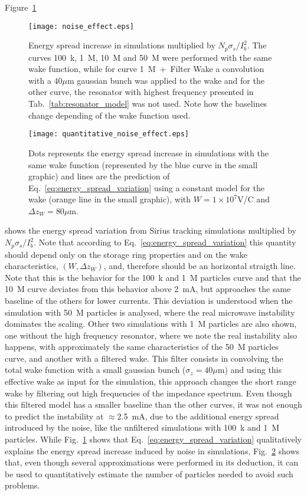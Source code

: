 \begin{apendicesenv}
    Figure~\ref{fig:noise_effect}
    \begin{figure}[t!]
        \centering
        \texttt{[image: noise\_effect.eps]}
        \caption{Energy spread increase in simulations multiplied by $N_p\sigma_s/I_b^2$. The curves 100~k, 1~M, 10~M and 50~M were performed with the same wake function, while for curve 1~M~+~Filter Wake a convolution with a $40\mu$m gaussian bunch was applied to the wake and for the other curve, the resonator with highest frequency presented in Tab.~\ref{tab:resonator_model} was not used. Note how the baselines change depending of the wake function used.}
        \label{fig:noise_effect}
    \end{figure}
    \begin{figure}[b!]
        \centering
        \texttt{[image: quantitative\_noise\_effect.eps]}
        \caption{Dots represents the energy spread increase in simulations with the same wake function (represented by the blue curve in the small graphic) and lines are the prediction of Eq.~\eqref{eq:energy_spread_variation} using a constant model for the wake (orange line in the small graphic), with $W=1\times10^7$V/C and $\Delta z_W = 80\mu$m. }
        \label{fig:quantitative_noise_effect}
    \end{figure}%
    shows the energy spread variation from Sirius tracking simulations multiplied by $N_p\sigma_s/I_b^2$. Note that according to Eq.~\eqref{eq:energy_spread_variation} this quantity should depend only on the storage ring properties and on the wake characteristics, $(W, \Delta z_W)$, and, therefore should be an horizontal straigth line. Note that this is the behavior for the 100~k and 1~M particles curve and that the 10~M curve deviates from this behavior above 2~mA, but approaches the same baseline of the others for lower currents. This deviation is understood when the simulation with 50~M particles is analysed, where the real microwave instability dominates the scaling. Other two simulations with 1~M particles are also shown, one without the high frequency resonator, where we note the real instability also happens, with approximately the same characteristics of the 50~M particles curve, and another with a filtered wake. This filter consists in convolving the total wake function with a small gaussian bunch ($\sigma_z=40\mu$m) and using this effective wake as input for the simulation, this approach changes the short range wake by filtering out high frequencies of the impedance spectrum. Even though this filtered model has a smaller baseline than the other curves, it was not enough to predict the instability at $\approx$2.5~mA, due to the additional energy spread introduced by the noise, like the unfiltered simulations with 100~k and 1~M particles. While Fig.~\ref{fig:noise_effect} shows that Eq.~\eqref{eq:energy_spread_variation} qualitatively explains the energy spread increase induced by noise in simulations, Fig.~\ref{fig:quantitative_noise_effect} shows that, even though several approximations were performed in its deduction, it can be used to quantitatively estimate the number of particles needed to avoid such problems.


\end{apendicesenv}
